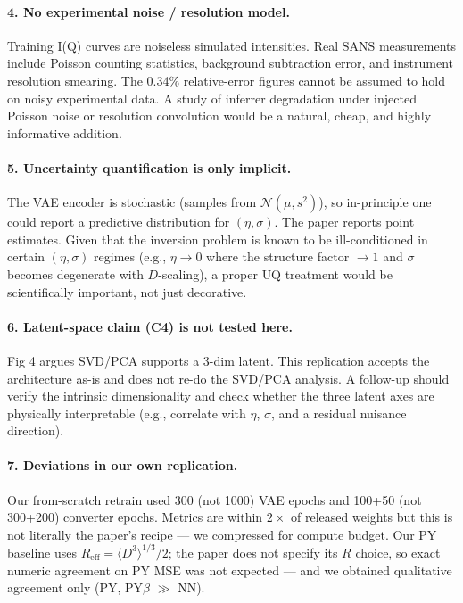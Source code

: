\documentclass[11pt]{article}
\begin{document}
\paragraph{4. No experimental noise / resolution model.}
Training I(Q) curves are noiseless simulated intensities. Real SANS
measurements include Poisson counting statistics, background subtraction
error, and instrument resolution smearing. The 0.34\% relative-error
figures cannot be assumed to hold on noisy experimental data. A study of
inferrer degradation under injected Poisson noise or resolution
convolution would be a natural, cheap, and highly informative addition.

\paragraph{5. Uncertainty quantification is only implicit.}
The VAE encoder is stochastic (samples from $\mathcal{N}(\mu,s^2)$), so
in-principle one could report a predictive distribution for
$(\eta,\sigma)$. The paper reports point estimates. Given that the
inversion problem is known to be ill-conditioned in certain
$(\eta,\sigma)$ regimes (e.g., $\eta\!\to\!0$ where the structure factor
$\to 1$ and $\sigma$ becomes degenerate with $D$-scaling), a proper UQ
treatment would be scientifically important, not just decorative.

\paragraph{6. Latent-space claim (C4) is not tested here.}
Fig 4 argues SVD/PCA supports a 3-dim latent. This replication accepts
the architecture as-is and does not re-do the SVD/PCA analysis. A
follow-up should verify the intrinsic dimensionality and check whether
the three latent axes are physically interpretable (e.g., correlate with
$\eta$, $\sigma$, and a residual nuisance direction).

\paragraph{7. Deviations in our own replication.}
Our from-scratch retrain used 300 (not 1000) VAE epochs and 100+50 (not
300+200) converter epochs. Metrics are within $2\times$ of released
weights but this is not literally the paper's recipe --- we compressed
for compute budget. Our PY baseline uses $R_\mathrm{eff}=\langle
D^3\rangle^{1/3}/2$; the paper does not specify its $R$ choice, so exact
numeric agreement on PY MSE was not expected --- and we obtained
qualitative agreement only (PY, PY$\beta$ $\gg$ NN).
\end{document}

